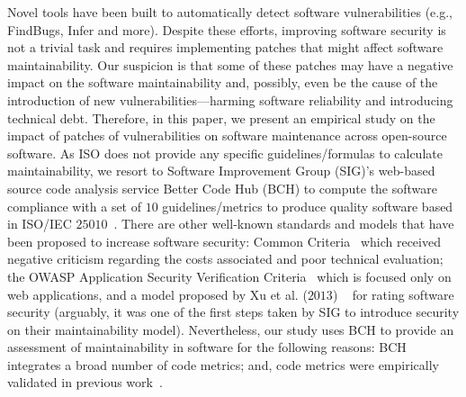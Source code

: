 \documentclass[10pt,conference]{IEEEtran}
\begin{document}
Novel tools have been built to automatically detect software vulnerabilities (e.g., FindBugs, Infer and more). 
Despite these efforts, improving software security is not a trivial task and requires 
implementing patches that might affect software maintainability. 
Our suspicion is that some of these patches may have a negative 
impact on the software maintainability and, possibly, even be the cause of the 
introduction of new vulnerabilities---harming software reliability and introducing technical debt. Therefore, 
in this paper, we present an empirical study on the impact of patches of 
vulnerabilities on software maintenance across open-source software.
%
%
As ISO does not provide any specific guidelines/formulas to calculate 
maintainability, we resort to Software Improvement Group (SIG)'s web-based source 
code analysis service Better Code Hub (BCH) to compute the software compliance 
with a set of $10$ guidelines/metrics to produce quality software 
based in ISO/IEC $25010$~\cite{Visser:2016:OREILLY}. 
There are other well-known standards and models that have been proposed
to increase software security: Common Criteria~\cite{common:2009} which received
negative criticism regarding the costs associated and poor technical evaluation;
the OWASP Application Security Verification Criteria~\cite{oswap:2009} which is
focused only on web applications, and a model proposed by Xu et al. ($2013$)
~\cite{6616351} for rating software security (arguably, it was one of the
first steps taken by SIG to introduce security on their maintainability model). 
Nevertheless, our study uses BCH to provide an assessment of maintainability in 
software for the following reasons: BCH integrates a broad number of code metrics; and, 
code metrics were empirically validated in previous work~\cite{Bijlsma:2012:FIR:2317098.2317124, 8530041, cruz2019energyoriented, 8785997}.
\end{document}

